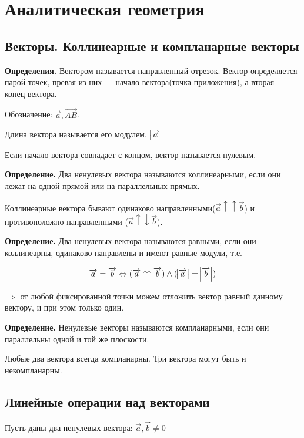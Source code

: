 \documentclass{article}
\begin{document}
\section{Аналитическая геометрия}

    \subsection{Векторы. Коллинеарные и компланарные векторы}

    \textbf{Определения.} Вектором называется направленный отрезок.
    Вектор определяется парой точек, превая из них --- начало вектора(точка приложения), а вторая --- конец вектора.

    Обозначение: \(\overrightarrow{a}, \overrightarrow{AB}\).

    Длина вектора называется его модулем. \(\abs{\overrightarrow{a}}\)

    Если начало вектора совпадает с концом, вектор называется нулевым.

    \textbf{Определение.} Два ненулевых вектора называются коллинеарными, если они лежат на одной прямой или на параллельных прямых.

    Коллинеарные вектора бывают одинаково направленными(\(\overrightarrow{a} \uparrow\uparrow \overrightarrow{b}\)) и противоположно направленными (\(\overrightarrow{a} \uparrow\downarrow \overrightarrow{b}\)).

    \textbf{Определение.} Два ненулевых вектора называются равными, если они коллинеарны, одинаково направлены и имеют равные модули, т.е.

    \[\overrightarrow{a} = \overrightarrow{b} \Leftrightarrow (\overrightarrow{a} \uparrow\uparrow \overrightarrow{b})\wedge(\abs{\overrightarrow{a}} = \abs{\overrightarrow{b}})\]
    
    \(\Rightarrow\) от любой фиксированной точки можем отложить вектор равный данному вектору, и при этом только один.

    \textbf{Определение.} Ненулевые векторы называются компланарными, если они параллельны одной и той же плоскости.
    
    Любые два вектора всегда компланарны. Три вектора могут быть и некомпланарны.

    \subsection{Линейные операции над векторами}

    Пусть даны два ненулевых вектора: \( \overrightarrow{a}, \overrightarrow{b} \neq 0 \)
    
\end{document}
